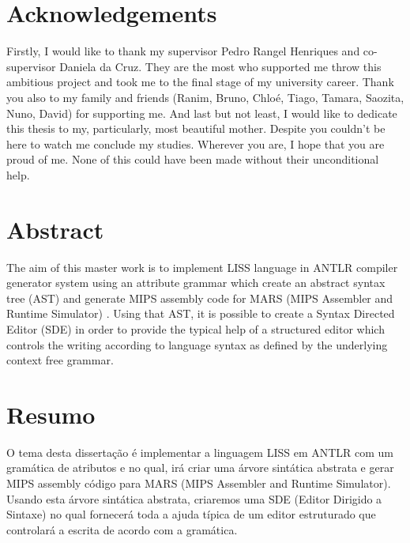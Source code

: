 \documentclass[
  oneside,
  11pt, a4paper,
  footinclude=true,
  headinclude=true,
  cleardoublepage=empty
]{scrbook}
\author{Damien da Silva Vaz}
\date{\myear} %
\begin{document}
	\umfrontcover	
	\umtitlepage
	
	\chapter*{Acknowledgements}
	Firstly, I would like to thank my supervisor Pedro Rangel Henriques and co-supervisor Daniela da Cruz. They are the most who supported me throw this ambitious project and took me to the final stage of my university career.\newline
Thank you also to my family and friends (Ranim, Bruno, Chloé, Tiago, Tamara, Saozita, Nuno, David) for supporting me.\newline
And last but not least, I would like to dedicate this thesis to my, particularly, most beautiful mother.
Despite you couldn't be here to watch me conclude my studies. Wherever you are, I hope that you are proud of me.	
None of this could have been made without their unconditional help.

	\chapter*{Abstract}
	The aim of this master work is to implement LISS language in ANTLR compiler generator system using an attribute grammar which create an abstract syntax tree (AST) and generate MIPS assembly code for MARS (MIPS Assembler and Runtime Simulator) .
Using that AST, it is possible to create a Syntax Directed Editor (SDE) in order to provide the typical help of a structured editor which controls the writing according to language syntax as defined by the underlying context free grammar.
	
	\cleardoublepage
	\chapter*{Resumo}
	O tema desta dissertação é implementar a linguagem LISS em ANTLR com um gramática de atributos e no qual, irá criar uma árvore sintática abstrata e gerar MIPS assembly código para MARS (MIPS Assembler and Runtime Simulator).
        Usando esta árvore sintática abstrata, criaremos uma SDE (Editor Dirigido a Sintaxe) no qual fornecerá toda a ajuda típica de um editor estruturado que controlará a escrita de acordo com a gramática.	
	
	\tableofcontents
	\listoffigures
	\listoftables
	\printglossary[type=\acronymtype]
	\clearpage
	\thispagestyle{empty}
\end{document}
